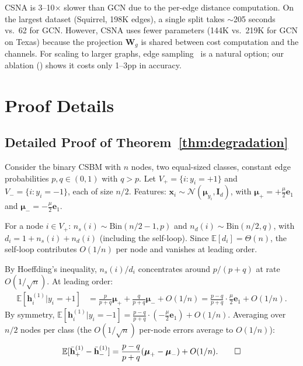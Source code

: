 \documentclass[runningheads]{llncs}
\newcommand{\E}{\mathbb{E}}
\newcommand{\bW}{\mathbf{W}}
\newcommand{\bx}{\mathbf{x}}
\newcommand{\bh}{\mathbf{h}}
\begin{document}
CSNA is 3--10$\times$ slower than GCN due to the per-edge distance computation.
On the largest dataset (Squirrel, 198K edges), a single split takes $\sim$205 seconds vs.\ 62 for GCN.
However, CSNA uses fewer parameters (144K vs.\ 219K for GCN on Texas) because the projection $\bW_g$ is shared between cost computation and the channels.
For scaling to larger graphs, edge sampling~\cite{rong2020dropedge} is a natural option; our ablation () shows it costs only 1--3pp in accuracy.


\section{Proof Details}\label{app:proofs}

\subsection{Detailed Proof of Theorem~\ref{thm:degradation}}

Consider the binary CSBM with $n$ nodes, two equal-sized classes, constant edge probabilities $p, q \in (0,1)$ with $q > p$.
Let $V_+ = \{i : y_i = +1\}$ and $V_- = \{i : y_i = -1\}$, each of size $n/2$.
Features: $\bx_i \sim \mathcal{N}(\boldsymbol{\mu}_{y_i}, \mathbf{I}_d)$, with $\boldsymbol{\mu}_+ = +\frac{\mu}{2}\mathbf{e}_1$ and $\boldsymbol{\mu}_- = -\frac{\mu}{2}\mathbf{e}_1$.

For a node $i \in V_+$: $n_s(i) \sim \mathrm{Bin}(n/2 - 1, p)$ and $n_d(i) \sim \mathrm{Bin}(n/2, q)$, with $d_i = 1 + n_s(i) + n_d(i)$ (including the self-loop).
Since $\E[d_i] = \Theta(n)$, the self-loop contributes $O(1/n)$ per node and vanishes at leading order.

By Hoeffding's inequality, $n_s(i)/d_i$ concentrates around $p/(p+q)$ at rate $O(1/\sqrt{n})$.
At leading order:
\begin{align}
    \E[\bh_i^{(1)} | y_i = +1] &= \frac{p}{p+q}\boldsymbol{\mu}_+ + \frac{q}{p+q}\boldsymbol{\mu}_- + O(1/n) = \frac{p-q}{p+q} \cdot \frac{\mu}{2}\mathbf{e}_1 + O(1/n).
\end{align}
By symmetry, $\E[\bh_i^{(1)} | y_i = -1] = \frac{p-q}{p+q} \cdot (-\frac{\mu}{2}\mathbf{e}_1) + O(1/n)$.
Averaging over $n/2$ nodes per class (the $O(1/\sqrt{n})$ per-node errors average to $O(1/n)$):
\begin{equation}
    \E[\bar{\bh}_+^{(1)} - \bar{\bh}_-^{(1)}] = \frac{p-q}{p+q}(\boldsymbol{\mu}_+ - \boldsymbol{\mu}_-) + O(1/n). \qed
\end{equation}
\end{document}
